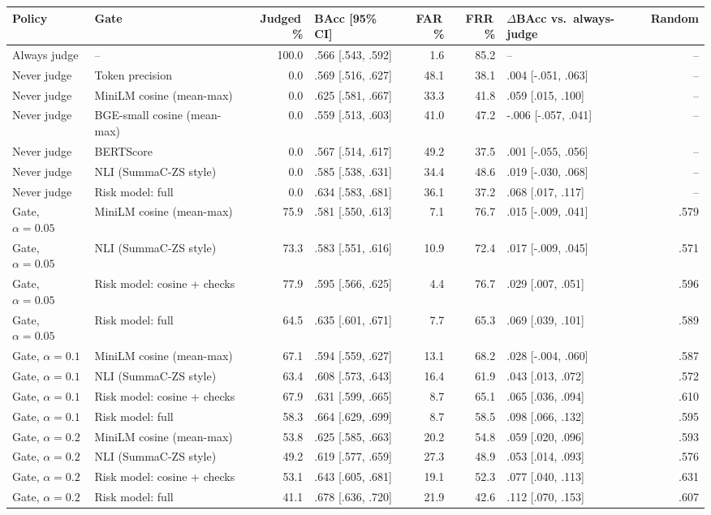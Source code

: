 \begin{tabular}{llrlrrlr}
\toprule
Policy & Gate & Judged\,\% & BAcc [95\% CI] & FAR\,\% & FRR\,\% & $\Delta$BAcc vs.\ always-judge & Random \\
\midrule
Always judge & -- & 100.0 & .566 [.543, .592] & 1.6 & 85.2 & -- & -- \\
\midrule
Never judge & Token precision & 0.0 & .569 [.516, .627] & 48.1 & 38.1 & .004 [-.051, .063] & -- \\
Never judge & MiniLM cosine (mean-max) & 0.0 & .625 [.581, .667] & 33.3 & 41.8 & .059 [.015, .100] & -- \\
Never judge & BGE-small cosine (mean-max) & 0.0 & .559 [.513, .603] & 41.0 & 47.2 & -.006 [-.057, .041] & -- \\
Never judge & BERTScore & 0.0 & .567 [.514, .617] & 49.2 & 37.5 & .001 [-.055, .056] & -- \\
Never judge & NLI (SummaC-ZS style) & 0.0 & .585 [.538, .631] & 34.4 & 48.6 & .019 [-.030, .068] & -- \\
Never judge & Risk model: full & 0.0 & .634 [.583, .681] & 36.1 & 37.2 & .068 [.017, .117] & -- \\
\midrule
Gate, $\alpha=0.05$ & MiniLM cosine (mean-max) & 75.9 & .581 [.550, .613] & 7.1 & 76.7 & .015 [-.009, .041] & .579 \\
Gate, $\alpha=0.05$ & NLI (SummaC-ZS style) & 73.3 & .583 [.551, .616] & 10.9 & 72.4 & .017 [-.009, .045] & .571 \\
Gate, $\alpha=0.05$ & Risk model: cosine + checks & 77.9 & .595 [.566, .625] & 4.4 & 76.7 & .029 [.007, .051] & .596 \\
Gate, $\alpha=0.05$ & Risk model: full & 64.5 & .635 [.601, .671] & 7.7 & 65.3 & .069 [.039, .101] & .589 \\
\midrule
Gate, $\alpha=0.1$ & MiniLM cosine (mean-max) & 67.1 & .594 [.559, .627] & 13.1 & 68.2 & .028 [-.004, .060] & .587 \\
Gate, $\alpha=0.1$ & NLI (SummaC-ZS style) & 63.4 & .608 [.573, .643] & 16.4 & 61.9 & .043 [.013, .072] & .572 \\
Gate, $\alpha=0.1$ & Risk model: cosine + checks & 67.9 & .631 [.599, .665] & 8.7 & 65.1 & .065 [.036, .094] & .610 \\
Gate, $\alpha=0.1$ & Risk model: full & 58.3 & .664 [.629, .699] & 8.7 & 58.5 & .098 [.066, .132] & .595 \\
\midrule
Gate, $\alpha=0.2$ & MiniLM cosine (mean-max) & 53.8 & .625 [.585, .663] & 20.2 & 54.8 & .059 [.020, .096] & .593 \\
Gate, $\alpha=0.2$ & NLI (SummaC-ZS style) & 49.2 & .619 [.577, .659] & 27.3 & 48.9 & .053 [.014, .093] & .576 \\
Gate, $\alpha=0.2$ & Risk model: cosine + checks & 53.1 & .643 [.605, .681] & 19.1 & 52.3 & .077 [.040, .113] & .631 \\
Gate, $\alpha=0.2$ & Risk model: full & 41.1 & .678 [.636, .720] & 21.9 & 42.6 & .112 [.070, .153] & .607 \\
\bottomrule
\end{tabular}
